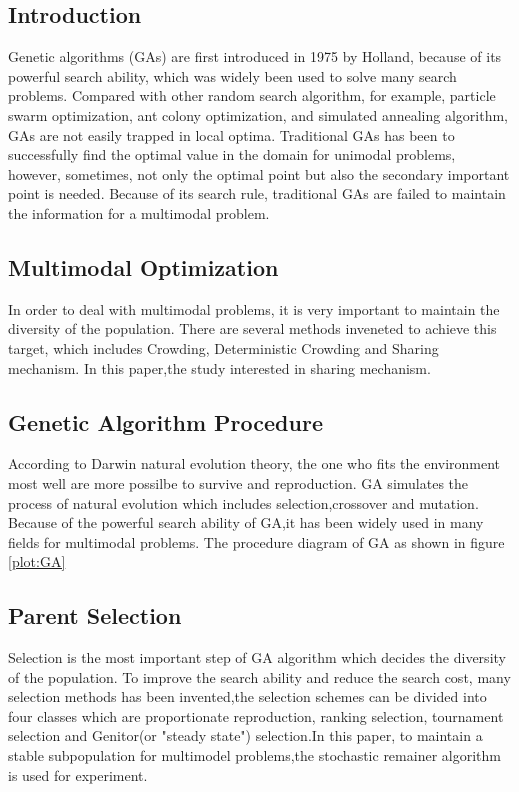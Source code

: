 \documentclass[smallextended]{svjour3}       %
\begin{document}
\begin{multicols}{2}

\section{Introduction}
  Genetic algorithms (GAs) are first introduced in 1975 by Holland\cite{sampson1976adaptation}, because
of its powerful search ability, which was widely been used to solve many search problems. Compared with
other random search algorithm, for example, particle swarm optimization, ant colony optimization, and 
simulated annealing algorithm\cite{zabinsky2010random}, GAs are not easily trapped in local optima. Traditional
GAs has been to successfully find the optimal value in the domain for unimodal problems, however,
sometimes, not only the optimal point but also the secondary important point is needed. Because of its
search rule, traditional GAs are failed to maintain the information for a multimodal problem.

\subsection{Multimodal Optimization}
  In order to deal with multimodal problems, it is very important to maintain the diversity of the 
population. There are several methods inveneted to achieve this target, which includes Crowding, Deterministic
Crowding and Sharing mechanism\cite{goldberg1987genetic}. In this paper,the study interested in sharing
mechanism. 

\subsection{Genetic Algorithm Procedure}
  According to Darwin natural evolution theory, the one who fits the environment most well are more 
possilbe to survive and reproduction. GA simulates the process of natural evolution which includes 
selection,crossover and mutation. Because of the powerful search ability of GA,it has been widely 
used in many fields for multimodal problems. The procedure diagram of GA as shown in figure \ref{plot:GA} 
 
\subsection{Parent Selection}
  Selection is the most important step of GA algorithm which decides the diversity of the population.
To improve the search ability and reduce the search cost, many selection methods \cite{goldberg1991comparative}
has been invented,the selection schemes can be divided into four classes which are proportionate reproduction,
ranking selection, tournament selection and Genitor(or "steady state") selection.In this paper, to maintain a 
stable subpopulation
for multimodel problems,the stochastic remainer algorithm is used for experiment.


\end{multicols}
\end{document}
